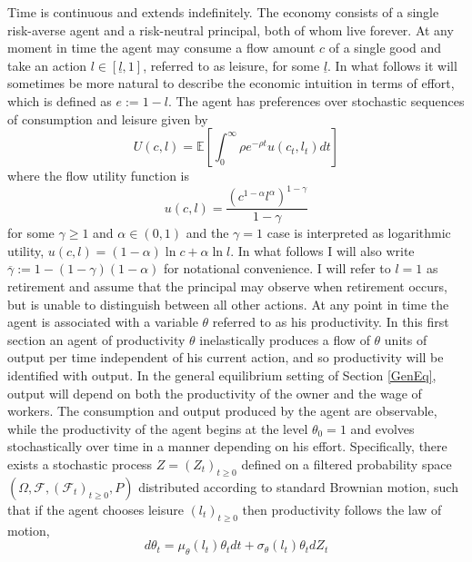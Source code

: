 \documentclass[11pt]{article}
\theoremstyle{plain}
\begin{document}
Time is continuous and extends indefinitely. The economy consists of a single risk-averse agent and a risk-neutral principal, both of whom live forever. At any moment in time the agent may consume a flow amount $c$ of a single good and take an action $l \in [\underline{l},1]$, referred to as leisure, for some $\underline{l}$. In what follows it will sometimes be more natural to describe the economic intuition in terms of effort, which is defined as $e := 1- l$. The agent has preferences over stochastic sequences of consumption and leisure given by
\begin{equation}
U(c,l) = \mathbb{E}{\left[\int_{0}^{\infty}\rho e^{-\rho t}u(c_t,l_t)dt\right]}
\label{prefagent}
\end{equation}
where the flow utility function is
\begin{equation}
u(c,l) = \frac{(c^{1-\alpha}l^{\alpha})^{1-\gamma}}{1-\gamma}
\label{flowutil2}
\end{equation}
for some $\gamma\geq1$ and $\alpha \in (0,1)$ and the $\gamma=1$ case is interpreted as logarithmic utility, $u(c,l) = (1-\alpha)\ln c+ \alpha\ln l$. In what follows I will also write $\overline{\gamma} := 1-(1-\gamma)(1-\alpha)$ for notational convenience. I will refer to $l = 1$ as retirement and assume that the principal may observe when retirement occurs, but is unable to distinguish between all other actions. At any point in time the agent is associated with a variable $\theta$ referred to as his productivity. In this first section an agent of productivity $\theta$ inelastically produces a flow of $\theta$ units of output per time independent of his current action, and so productivity will be identified with output. In the general equilibrium setting of Section \ref{GenEq}, output will depend on both the productivity of the owner and the wage of workers. The consumption and output produced by the agent are observable, while the productivity of the agent begins at the level $\theta_0=1$ and evolves stochastically over time in a manner depending on his effort. Specifically, there exists a stochastic process $Z = (Z_t)_{t\geq0}$ defined on a filtered probability space $(\Omega, \mathcal{F}, (\mathcal{F}_t)_{t\geq0},P)$ distributed according to standard Brownian motion, such that if the agent chooses leisure $(l_t)_{t\geq0}$ then productivity follows the law of motion, %
\begin{equation}
d\theta_t = \mu_{\theta}(l_t) \theta_tdt + \sigma_{\theta}(l_t) \theta_t dZ_t
\label{typeevol}
\end{equation}
\end{document}
